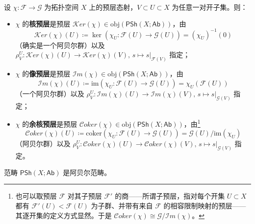 \begin{Def}
设 $\chi:\mathcal{F}\rightarrow\mathcal{G}$ 为拓扑空间 $X$ 上的预层态射，$V\subset U\subset X$ 为任意一对开子集。则：
\begin{itemize}[leftmargin=0.5cm]
	\item $\chi$ 的\textbf{核预层}是预层 $\mathcal{K}er(\chi)\in\text{obj}(\mathsf{PSh}(X;\mathsf{Ab}))$，由
	\begin{equation}
		\mathcal{K}er(\chi)(U)\coloneqq\ker(\chi_U:\mathcal{F}(U)\rightarrow\mathcal{G}(U))=(\chi_U)^{-1}(0)
	\end{equation}
	（确实是一个阿贝尔群）以及 $\rho^U_V:\mathcal{K}er(\chi)(U)\rightarrow\mathcal{K}er(\chi)(V),\,s\mapsto s|_{\mathcal{F}(V)}$ 指定；
	
	\item $\chi$ 的\textbf{像预层}是预层 $\mathcal{I}m(\chi)\in\text{obj}(\mathsf{PSh}(X;\mathsf{Ab}))$，由
	\begin{equation}
		\mathcal{I}m(\chi)(U)\coloneqq\text{im}(\chi_U:\mathcal{F}(U)\rightarrow\mathcal{G}(U))=\chi_U(\mathcal{F}(U))
	\end{equation}
	（一个阿贝尔群）以及 $\rho^U_V:\mathcal{I}m(\chi)(U)\rightarrow\mathcal{I}m(\chi)(V),\,s\mapsto s|_{\mathcal{G}(V)}$ 指定；
	
	\item $\chi$ 的\textbf{余核预层}是预层 $\mathcal{C}oker(\chi)\in\text{obj}(\mathsf{PSh}(X;\mathsf{Ab}))$，由\footnote{也可以取预层 $\mathcal{F}$ 对其子预层 $\mathcal{F}'$ 的商——所谓子预层，指对每个开集 $U\subset X$ 都有 $\mathcal{F}'(U)<\mathcal{F}(U)$ 为子群、并带有来自 $\mathcal{F}$ 的相容限制映射的预层——其逐开集的定义方式显然。于是 $\mathcal{C}oker(\chi)\cong\mathcal{G}/\mathcal{I}m(\chi)$。}
	\begin{equation}
		\mathcal{C}oker(\chi)(U)\coloneqq\text{coker}(\chi_U:\mathcal{F}(U)\rightarrow\mathcal{G}(U))=\mathcal{G}(U)/\text{im}(\chi_U)
	\end{equation}
	（阿贝尔群）以及 $\rho^U_V:\mathcal{C}oker(\chi)(U)\rightarrow\mathcal{C}oker(\chi)(V),\,s\mapsto s|_{\mathcal{G}(V)}$ 指定。
\end{itemize}
\end{Def}

\begin{Lem}\label{PShabelian}
范畴 $\mathsf{PSh}(X;\mathsf{Ab})$ 是阿贝尔范畴。
\end{Lem}

